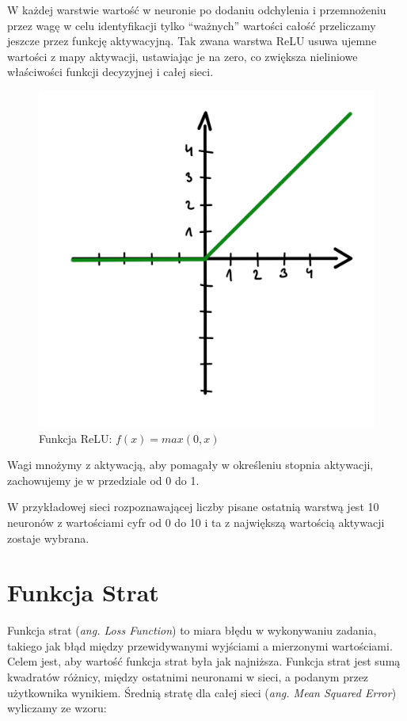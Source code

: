 \documentclass[openright]{xmgr}
\begin{document}
W każdej warstwie  wartość w neuronie po dodaniu odchylenia i przemnożeniu przez wagę w celu identyfikacji tylko “ważnych” wartości całość przeliczamy jeszcze przez funkcję aktywacyjną. 
Tak zwana warstwa ReLU usuwa ujemne wartości z mapy aktywacji, ustawiając je na zero, co zwiększa nieliniowe właściwości funkcji decyzyjnej i całej sieci.
\begin{figure}[!tbh]
\centering
\includegraphics[width=.8\hsize]{fig/4}
\caption{Funkcja ReLU: $f(x) = max(0, x)$\label{RYS.3}}
\end{figure}

 Wagi mnożymy z aktywacją, aby pomagały w określeniu stopnia aktywacji, zachowujemy je w przedziale od 0 do 1.
 
 W przykładowej sieci rozpoznawającej liczby pisane ostatnią warstwą jest 10 neuronów z wartościami cyfr od 0 do 10 i ta z największą wartością aktywacji zostaje wybrana. 
 
 \section{Funkcja Strat \label{s:dsssl}}
 
\indent \indent Funkcja strat (\textit{ang. Loss Function}) to miara błędu w wykonywaniu zadania, takiego jak błąd między przewidywanymi wyjściami a mierzonymi wartościami. Celem jest, aby wartość funkcja strat była jak najniższa. 
Funkcja strat jest sumą kwadratów różnicy, między ostatnimi neuronami w sieci, a podanym przez użytkownika wynikiem. Średnią stratę dla całej sieci (\textit{ang. Mean Squared Error}) wyliczamy ze wzoru:  
\end{document}
